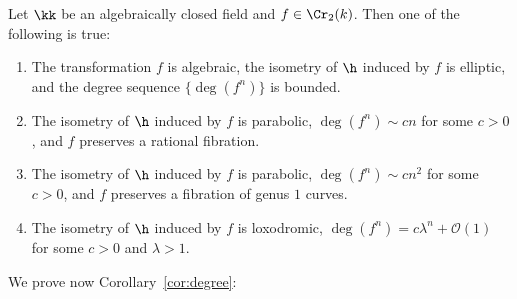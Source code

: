 \begin{theorem}\label{thm:hyperboloid}
Let $\kk$ be an algebraically closed field and $f\in\Cr_2(k)$. Then one of the following is true:
\begin{enumerate}
\item The transformation $f$ is algebraic, the isometry of $\h$ induced by $f$ is elliptic, and the degree sequence $\{\deg(f^n)\}$ is bounded.
\item[(2a)] The isometry of $\h$ induced by $f$ is parabolic, $\deg(f^n)\sim cn$ for some $c>0$, and $f$ preserves a rational fibration.
\item[(2b)] The isometry of $\h$ induced by $f$ is parabolic, $\deg(f^n)\sim cn^2$ for some $c>0$, and $f$ preserves a fibration of genus $1$ curves.
\item[(3)] The isometry of $\h$ induced by $f$ is loxodromic, $\deg(f^n)=c\lambda^n +\mathcal{O}(1)$ for some $c>0$ and $\lambda>1$.
\end{enumerate}
\end{theorem}

We prove now Corollary~\ref{cor:degree}:


